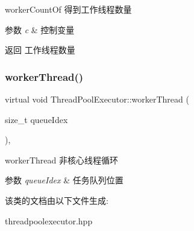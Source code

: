 worker\+Count\+Of 得到工作线程数量 


\begin{DoxyParams}{参数}
{\em c} & 控制变量\\
\hline
\end{DoxyParams}
\begin{DoxyReturn}{返回}
工作线程数量 
\end{DoxyReturn}
\mbox{\label{classThreadPoolExecutor_a844902ce61fb16b11a569b8ee56e80e9}} 
\subsubsection{\texorpdfstring{worker\+Thread()}{workerThread()}}
{\footnotesize\ttfamily virtual void Thread\+Pool\+Executor\+::worker\+Thread (\begin{DoxyParamCaption}\item[{size\+\_\+t}]{queue\+Idex }\end{DoxyParamCaption})\hspace{0.3cm}{\ttfamily [protected]}, {\ttfamily [virtual]}}



worker\+Thread 非核心线程循环 


\begin{DoxyParams}{参数}
{\em queue\+Idex} & 任务队列位置 \\
\hline
\end{DoxyParams}


该类的文档由以下文件生成\+:\begin{DoxyCompactItemize}
\item 
threadpoolexecutor.\+hpp\end{DoxyCompactItemize}
